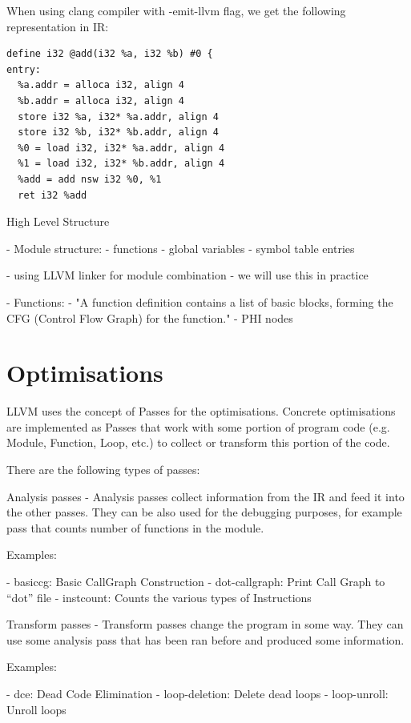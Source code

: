 \documentclass[12pt, twoside]{fithesis2}
\renewcommand{\_}{\leavevmode \kern0.07em\vbox{\hrule width0.4em}}
\begin{document}
When using clang compiler with -emit-llvm flag, we get the following representation in IR:

\begin{verbatim}
define i32 @add(i32 %a, i32 %b) #0 {
entry:
  %a.addr = alloca i32, align 4
  %b.addr = alloca i32, align 4
  store i32 %a, i32* %a.addr, align 4
  store i32 %b, i32* %b.addr, align 4
  %0 = load i32, i32* %a.addr, align 4
  %1 = load i32, i32* %b.addr, align 4
  %add = add nsw i32 %0, %1
  ret i32 %add
\end{verbatim}

High Level Structure

- Module structure:
 - functions
 - global variables
 - symbol table entries

- using LLVM linker for module combination
 - we will use this in practice

- Functions:
 - "A function definition contains a list of basic blocks, forming the CFG
 (Control Flow Graph) for the function."
 - PHI nodes


\section{Optimisations}
\label{sec:llvm-opt}

LLVM uses the concept of Passes for the optimisations. Concrete optimisations
are implemented as Passes that work with some portion of program code (e.g.
Module, Function, Loop, etc.) to collect or transform this portion of the code.
\cite{llvm-passes}

There are the following types of passes:

Analysis passes
- Analysis passes collect information from the IR and feed it into the other
passes. They can be also used for the debugging purposes, for example pass that
counts number of functions in the module.

Examples:

- basiccg: Basic CallGraph Construction
- dot-callgraph: Print Call Graph to “dot” file
- instcount: Counts the various types of Instructions

Transform passes
- Transform passes change the program in some way. They can use some analysis
pass that has been ran before and produced some information.

Examples:

- dce: Dead Code Elimination
- loop-deletion: Delete dead loops
- loop-unroll: Unroll loops
\end{document}
